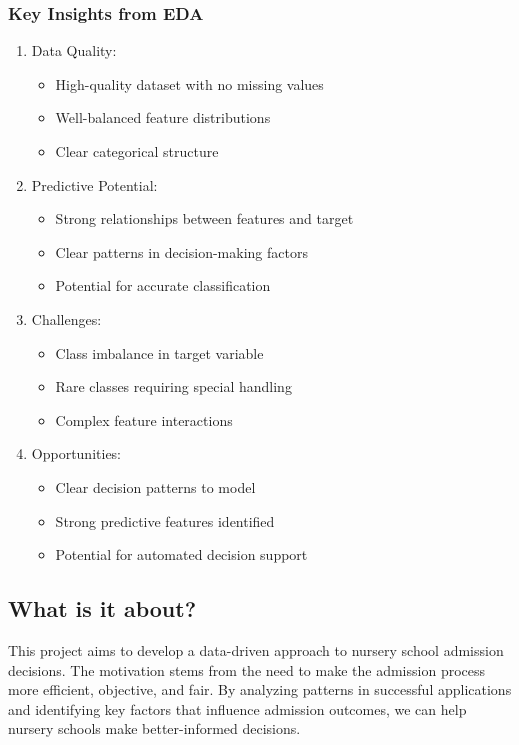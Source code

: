 \subsubsection{Key Insights from EDA}
\begin{enumerate}
    \item Data Quality:
    \begin{itemize}
        \item High-quality dataset with no missing values
        \item Well-balanced feature distributions
        \item Clear categorical structure
    \end{itemize}
    
    \item Predictive Potential:
    \begin{itemize}
        \item Strong relationships between features and target
        \item Clear patterns in decision-making factors
        \item Potential for accurate classification
    \end{itemize}
    
    \item Challenges:
    \begin{itemize}
        \item Class imbalance in target variable
        \item Rare classes requiring special handling
        \item Complex feature interactions
    \end{itemize}
    
    \item Opportunities:
    \begin{itemize}
        \item Clear decision patterns to model
        \item Strong predictive features identified
        \item Potential for automated decision support
    \end{itemize}
\end{enumerate}

\subsection{What is it about?}
This project aims to develop a data-driven approach to nursery school admission decisions. The motivation stems from the need to make the admission process more efficient, objective, and fair. By analyzing patterns in successful applications and identifying key factors that influence admission outcomes, we can help nursery schools make better-informed decisions.

